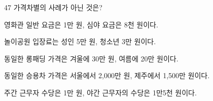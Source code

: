 \begin{question}{47}
가격차별의 사례가 아닌 것은?
\begin{choices}
  \item 영화관 일반 요금은 1만 원, 심야 요금은 8천 원이다.
  \item 놀이공원 입장료는 성인 5만 원, 청소년 3만 원이다.
  \item 동일한 롱패딩 가격은 겨울에 30만 원, 여름에 20만 원이다.
  \item 동일한 승용차 가격은 서울에서 2,000만 원, 제주에서 1,500만 원이다.
  \item 주간 근무자 수당은 1만 원, 야간 근무자의 수당은 1만5천 원이다.
\end{choices}
\end{question}
